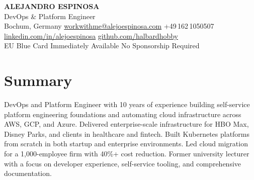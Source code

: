 \documentclass[a4paper,9pt]{extarticle}
\begin{document}
\color{darktext}
\thispagestyle{firstpage}


\noindent
{}%
%
\vspace*{-1.0cm}
\begin{center}
  {\LARGE\bfseries\color{headerwhite}ALEJANDRO ESPINOSA}\\[0.3em]
  {\large\lightfont\color{accent}DevOps \& Platform Engineer}\\[0.55em]
  {\small\color{headerwhite}%
    Bochum, Germany\enspace{\color{accent}|}\enspace
    \href{mailto:workwithme@alejoespinosa.com}{\color{headerwhite}workwithme@alejoespinosa.com}\enspace{\color{accent}|}\enspace
    +49\,162\,1050507\\[0.2em]
    \href{https://www.linkedin.com/in/alejoespinosa}{\color{headerwhite}linkedin.com/in/alejoespinosa}\enspace{\color{accent}|}\enspace
    \href{https://github.com/halbardhobby}{\color{headerwhite}github.com/halbardhobby}
  }\\[0.45em]
  {\small\mediumfont\color{accent}EU Blue Card\enspace{\color{headerwhite}|}\enspace
  \color{accent}Immediately Available\enspace{\color{headerwhite}|}\enspace
  \color{accent}No Sponsorship Required}
\end{center}

\vspace{0.3cm}


\section{Summary}

DevOps and Platform Engineer with 10 years of experience building self-service platform engineering foundations and automating cloud infrastructure across AWS, GCP, and Azure. Delivered enterprise-scale infrastructure for HBO Max, Disney Parks, and clients in healthcare and fintech. Built Kubernetes platforms from scratch in both startup and enterprise environments. Led cloud migration for a 1,000-employee firm with 40\%+ cost reduction. Former university lecturer with a focus on developer experience, self-service tooling, and comprehensive documentation.
\end{document}
